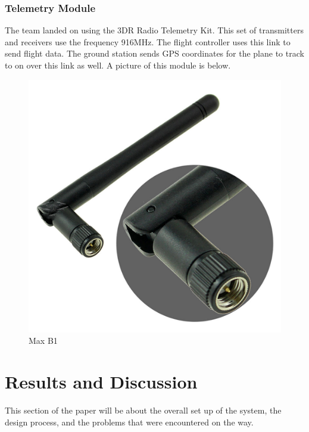 \documentclass[12pt,journal,compsoc]{IEEEtran}
\begin{document}
\subsubsection{Telemetry Module}
The team landed on using the 3DR Radio Telemetry Kit. This set of transmitters and receivers use the frequency 916MHz. The flight controller uses this link to send flight data. The ground station sends GPS coordinates for the plane to track to on over this link as well. A picture of this module is below.
\begin{figure}[h!]
\hspace*{0cm}
\centering
\includegraphics[scale=.125]{telemmodule.jpg}
\caption{Max B1}
\label{mavStruct}
\end{figure}

\section{Results and Discussion}
This section of the paper will be about the overall set up of the system, the design process, and the problems that were encountered on the way.
\end{document}
